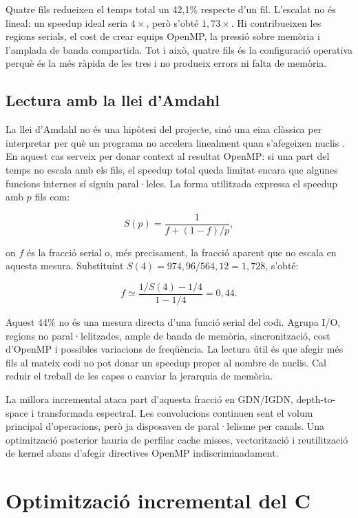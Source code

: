 Quatre fils redueixen el temps total un 42,1\% respecte d'un fil. L'escalat no
és lineal: un speedup ideal seria $4\times$, però s'obté $1,73\times$. Hi
contribueixen les regions serials, el cost de crear equips OpenMP, la pressió
sobre memòria i l'amplada de banda compartida. Tot i això, quatre fils és la
configuració operativa perquè és la més ràpida de les tres i no produeix
errors ni falta de memòria.

\subsection{Lectura amb la llei d'Amdahl}

La llei d'Amdahl no és una hipòtesi del projecte, sinó una eina clàssica per
interpretar per què un programa no accelera linealment quan s'afegeixen nuclis
\cite{amdahl1967}. En aquest cas serveix per donar context al resultat OpenMP:
si una part del temps no escala amb els fils, el speedup total queda limitat
encara que algunes funcions internes sí siguin paral·leles. La forma utilitzada
expressa el speedup amb $p$ fils com:

\begin{equation}
S(p)=\frac{1}{f+(1-f)/p},
\end{equation}

on $f$ és la fracció serial o, més precisament, la fracció aparent que no escala
en aquesta mesura. Substituint $S(4)=974,96/564,12=1,728$, s'obté:

\begin{equation}
f\simeq
\frac{1/S(4)-1/4}{1-1/4}=0,44.
\end{equation}

Aquest 44\% no és una mesura directa d'una funció serial del codi. Agrupa I/O,
regions no paral·lelitzades, ample de banda de memòria, sincronització, cost
d'OpenMP i possibles variacions de freqüència. La lectura útil és que afegir més
fils al mateix codi no pot donar un speedup proper al nombre de nuclis. Cal
reduir el treball de les capes o canviar la jerarquia de memòria.

La millora incremental ataca part d'aquesta fracció en GDN/IGDN,
depth-to-space i transformada espectral. Les convolucions continuen sent el
volum principal d'operacions, però ja disposaven de paral·lelisme per canals.
Una optimització posterior hauria de perfilar cache misses, vectorització i
reutilització de kernel abans d'afegir directives OpenMP indiscriminadament.

\section{Optimització incremental del C}\label{sec:c_optimization}

